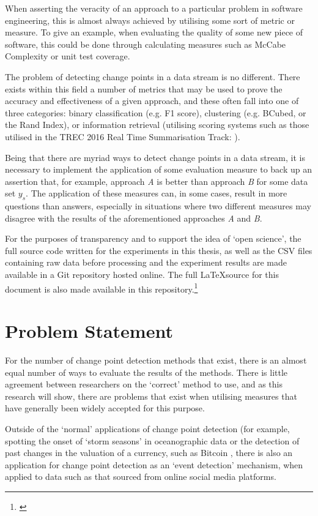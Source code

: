 \documentclass[../main.tex]{subfiles}
\begin{document}
When asserting the veracity of an approach to a particular problem in software engineering, this is almost always achieved by utilising some sort of metric or measure. To give an example, when evaluating the quality of some new piece of software, this could be done through calculating measures such as McCabe Complexity \cite{ThomasJ.McCabe1976} or unit test coverage.

The problem of detecting change points in a data stream is no different. There exists within this field a number of metrics that may be used to prove the accuracy and effectiveness of a given approach, and these often fall into one of three categories: binary classification (e.g. F1 score), clustering (e.g. BCubed, or the Rand Index), or information retrieval (utilising scoring systems such as those utilised in the TREC 2016 Real Time Summarisation Track: \cite{trec2016}).

Being that there are myriad ways to detect change points in a data stream, it is necessary to implement the application of some evaluation measure to back up an assertion that, for example, approach \emph{A} is better than approach \emph{B} for some data set $y_s$. The application of these measures can, in some cases, result in more questions than answers, especially in situations where two different measures may disagree with the results of the aforementioned approaches \emph{A} and \emph{B}.\bigskip

\noindent For the purposes of transparency and to support the idea of `open science', the full source code written for the experiments in this thesis, as well as the CSV files containing raw data before processing and the experiment results are made available in a Git repository hosted online. The full \LaTeX source for this document is also made available in this repository.\footnote{\url{}}

\section{Problem Statement}
\label{Problem Statement}

For the number of change point detection methods that exist, there is an almost equal number of ways to evaluate the results of the methods. There is little agreement between researchers on the `correct' method to use, and as this research will show, there are problems that exist when utilising measures that have generally been widely accepted for this purpose.

Outside of the `normal' applications of change point detection (for example, spotting the onset of `storm seasons' in oceanographic data \cite{Killick2011} or the detection of past changes in the valuation of a currency, such as Bitcoin \cite{Buntain2014}, there is also an application for change point detection as an `event detection' mechanism, when applied to data such as that sourced from online social media platforms.
\end{document}
